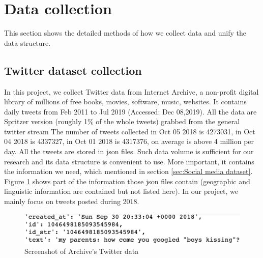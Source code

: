 \section{Data collection}
\label{sec:Data collection}
This section shows the detailed methods of how we collect data and unify the data structure. 
\subsection{Twitter dataset collection}
\label{sec:Twitter dataset}
In this project, we collect Twitter data from Internet Archive\cite{archive}, a non-profit digital library of millions of free books, movies, software, music, websites. It contains daily tweets from Feb 2011 to Jul 2019 (Accessed: Dec 08,2019). All the data are Spritzer version (roughly 1\% of the whole tweets) grabbed from the general twitter stream The number of tweets collected in Oct 05 2018 is 4273031, in Oct 04 2018 is 4337327, in Oct 01 2018 is 4317376, on average is above 4 million per day. All the tweets are stored in json files. Such data volume is sufficient for our research and its data structure is convenient to use. More important, it contains the information we need, which mentioned in section \ref{sec:Social media dataset}. Figure \ref{fig:archive1} shows part of the information those json files contain (geographic and linguistic information are contained but not listed here). In our project, we mainly focus on tweets posted during 2018.\\
\begin{figure}[!htbp]
    \center
    \includegraphics[width=5.5in]{images/archive1.png}
    \caption{Screenshot of Archive's Twitter data}
    \label{fig:archive1}
\end{figure} 

